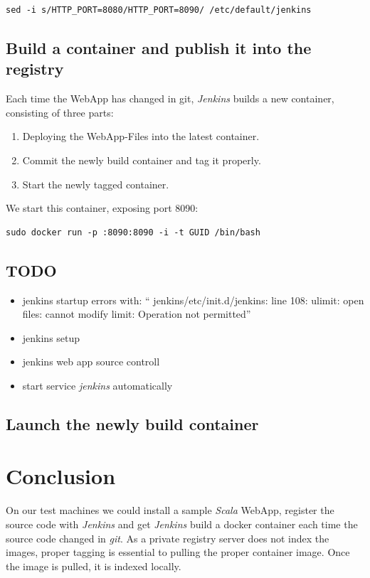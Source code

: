\documentclass[11pt]{article}
\begin{document}
\begin{verbatim}
sed -i s/HTTP_PORT=8080/HTTP_PORT=8090/ /etc/default/jenkins
\end{verbatim}
\subsection{Build a container and publish it into the registry}
\label{sec-5-3}

Each time the WebApp has changed in git, \emph{Jenkins} builds a new container,  consisting of three parts:
\begin{enumerate}
\item Deploying the WebApp-Files into the latest container.
\item Commit the newly build container and tag it properly.
\item Start the newly tagged container.
\end{enumerate}

We start this container, exposing port 8090:

\begin{verbatim}
sudo docker run -p :8090:8090 -i -t GUID /bin/bash
\end{verbatim}
\subsection{\textbf{TODO}}
\label{sec-5-4}

\begin{itemize}
\item jenkins startup errors with: ``  jenkins/etc/init.d/jenkins: line 108: ulimit: open files: cannot modify limit: Operation not permitted''
\item jenkins setup
\item jenkins web app source controll
\item start service \emph{jenkins} automatically
\end{itemize}
\subsection{Launch the newly build container}
\label{sec-5-5}
\section{Conclusion}
\label{sec-6}

On our test machines we could install a sample \emph{Scala} WebApp, register the source code with \emph{Jenkins} and get \emph{Jenkins} build a docker container each time the source code changed in \emph{git}. As a private registry server does not index the images, proper tagging is essential to pulling the proper container image. Once the image is pulled, it is indexed locally.
\end{document}
